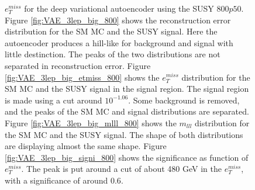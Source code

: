 \begin{figure}[H]
{    $e_T^{miss}$ for the deep variational autoencoder using the SUSY $800p50$.
    Figure \ref{fig:VAE_3lep_big_800} shows the reconstruction error 
    distribution for the SM MC and the SUSY signal. Here the autoencoder produces a hill-like for background and 
    signal with little destinction. The peaks of the two distributions are not separated in reconstruction error. Figure \ref{fig:VAE_3lep_big_etmiss_800} 
    shows the $e_T^{miss}$ distribution for the SM MC and the SUSY signal in the signal region. 
    The signal region is made using a cut around $10^{-1.06}$. Some background is removed, and the peaks of the SM MC and signal 
    distributions are separated. Figure \ref{fig:VAE_3lep_big_mlll_800} shows the $m_{lll}$ distribution for the SM MC and the SUSY signal. 
    The shape of both distributions are displaying almost the same shape. Figure \ref{fig:VAE_3lep_big_signi_800} shows the significance as 
    function of $e_T^{miss}$. The peak is put around a cut of about 480 GeV in the $e_T^{miss}$, with a significance of around $0.6$.}
    \label{fig:VAE_3lep_big_rec_sig_signi_800}
\end{figure}

